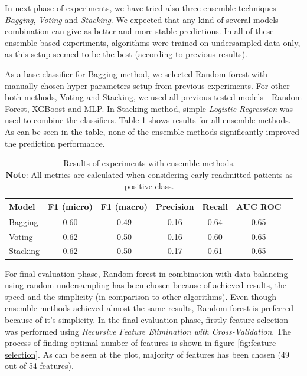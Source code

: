 \documentclass[runningheads]{llncs}
\begin{document}
In next phase of experiments, we have tried also three ensemble techniques - \textit{Bagging}, \textit{Voting} and \textit{Stacking}. We expected that any kind of several models combination can give as better and more stable predictions. In all of these ensemble-based experiments, algorithms were trained on undersampled data only, as this setup seemed to be the best (according to previous results).

As a base classifier for Bagging method, we selected Random forest with manually chosen hyper-parameters setup from previous experiments. For other both methods, Voting and Stacking, we used all previous tested models - Random Forest, XGBoost and MLP. In Stacking method, simple \textit{Logistic Regression} was used to combine the classifiers. Table \ref{table:ensemble-results} shows results for all ensemble methods. As can be seen in the table, none of the ensemble methods significantly improved the prediction performance. 
\begin{table}
    \centering
    \caption{Results of experiments with ensemble methods.\\\textbf{Note}: All metrics are calculated when considering early readmitted patients as positive class.}
    \begin{tabular}{ |l|c|c|c|c|c|c| } 
    \hline
    \textbf{Model} & \textbf{F1 (micro)} & \textbf{F1 (macro)} & \textbf{Precision} &  \textbf{Recall} &  \textbf{AUC ROC} \\
    \hline
    Bagging &   0.60    &   0.49    &   0.16    &   0.64   &   0.65\\
    Voting &   0.62    &   0.50    &   0.16    &   0.60   &   0.65\\
    Stacking &   0.62    &   0.50    &   0.17    &   0.61   &   0.65\\
    \hline
    \end{tabular}
    \label{table:ensemble-results}
\end{table}

For final evaluation phase, Random forest in combination with data balancing using random undersampling has been chosen because of achieved results, the speed and the simplicity (in comparison to other algorithms). Even though ensemble methods achieved almost the same results, Random forest is preferred because of it's simplicity. In the final evaluation phase, firstly feature selection was performed using \textit{Recursive Feature Elimination with Cross-Validation}. The process of finding optimal number of features is shown in figure \ref{fig:feature-selection}. As can be seen at the plot, majority of features has been chosen (49 out of 54 features).
\end{document}

